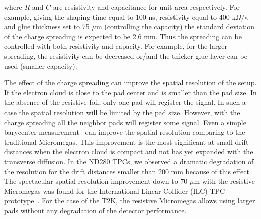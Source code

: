 \documentclass[../main.tex]{subfiles}
\begin{document}
where $R$ and $C$ are resistivity and capacitance for unit area respectively. For example, giving the shaping time equal to 100 ns, resistivity equal to 400 $\text{k}\Omega/\square$, and glue thickness set to 75 $\mu\text{m}$ (controlling the capacity) the standard deviation of the charge spreading is expected to be 2.6 mm. Thus the spreading can be controlled with both resistivity and capacity. For example, for the larger spreading, the resistivity can be decreased or/and the thicker glue layer can be used (smaller capacity).

The effect of the charge spreading can improve the spatial resolution of the setup. If the electron cloud is close to the pad center and is smaller than the pad size. In the absence of the resistive foil, only one pad will register the signal. In such a case the spatial resolution will be limited by the pad size. However, with the charge spreading all the neighbor pads will register some signal. Even a simple barycenter measurement~\cite{Dixit2004} can improve the spatial resolution comparing to the traditional Micromegas. This improvement is the most significant at small drift distances when the electron cloud is compact and not has yet expanded with the transverse diffusion. In the ND280 TPCs, we observed a dramatic degradation of the resolution for the drift distances smaller than 200 mm because of this effect. The spectacular spatial resolution improvement down to 70 $\mu\text{m}$ with the resistive Micromegas was found for the International Linear Collider (ILC) TPC prototype~\cite{Attie2011}. For the case of the T2K, the resistive Micromegas allows using larger pads without any degradation of the detector performance.
\end{document}
